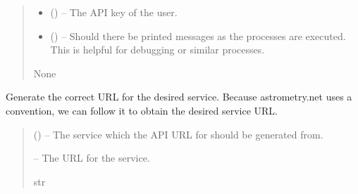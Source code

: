 \documentclass[letterpaper,11pt,english]{sphinxmanual}
\begin{document}
\begin{savenotes}
\begin{fulllineitems}
\begin{savenotes}
\begin{fulllineitems}
\begin{quote}
\begin{description}
\begin{itemize}
\item {} 
\sphinxAtStartPar
{} () – The API key of the user.

\item {} 
\sphinxAtStartPar
{} (\sphinxstyleliteralemphasis{\sphinxupquote{, }}) – Should there be printed messages as the processes are executed.
This is helpful for debugging or similar processes.

\end{itemize}

\sphinxAtStartPar
None

\end{description}\end{quote}

\end{fulllineitems}\end{savenotes}


\begin{savenotes}\begin{fulllineitems}
\label{\detokenize{code/opihiexarata.astrometry.webclient:opihiexarata.astrometry.webclient.AstrometryNetWebAPIEngine._generate_service_url}}
\pysigstartsignatures
{}
\pysigstopsignatures
\sphinxAtStartPar
Generate the correct URL for the desired service. Because astrometry.net
uses a convention, we can follow it to obtain the desired service URL.
\begin{quote}\begin{description}
\sphinxAtStartPar
{} () – The service which the API URL for should be generated from.

\sphinxAtStartPar
{} – The URL for the service.

\sphinxAtStartPar
str


\end{description}
\end{quote}
\end{fulllineitems}
\end{savenotes}
\end{fulllineitems}
\end{savenotes}
\end{document}
